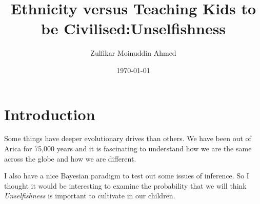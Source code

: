 \documentclass{amsart}
\title{Ethnicity versus Teaching Kids to be Civilised:Unselfishness}
\author{Zulfikar Moinuddin Ahmed}
\date{\today}
\begin{document}
\maketitle
\section{Introduction}

Some things have deeper evolutionary drives than others.  We have been out of Arica for 75,000 years and it is fascinating to understand how we are the same across the globe and how we are different.

I also have a nice Bayesian paradigm to test out some issues of inference.  So I thought it would be interesting to examine the probability that we will think {\em Unselfishness} is important to cultivate in our children.
\end{document}
